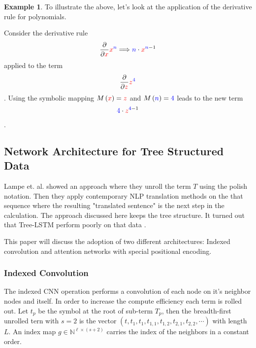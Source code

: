 \documentclass{scrartcl}
\theoremstyle{definition}
\newtheorem{exmp}{Example}[section]
\begin{document}
\begin{exmp}
To illustrate the above, let's look at the application of the derivative rule for polynomials.

Consider the derivative rule
\begin{align}
	\frac{\partial}{\partial {\color{red}x}} {\color{red}x}^{\color{blue}n} \Longrightarrow {\color{blue}n}\cdot {\color{red}x}^{{\color{blue}n}-1} 
\end{align}
applied to the term
\begin{align}
	\frac{\partial}{\partial {\color{red}z}} {\color{red}z}^{\color{blue}4}
\end{align}.
Using the symbolic mapping $M\left({\color{red}x}\right) = \color{red}z$ and $M\left({\color{blue}n} \right) = {\color{blue}4}$ leads to the new term
\begin{align}
	{\color{blue}4}\cdot {\color{red}z}^{{\color{blue}4}-1} 
\end{align}.

\end{exmp}

\subsection{Network Architecture for Tree Structured Data}

Lampe et. al. showed an approach where they unroll the term $T$ using the polish notation.
Then they apply contemporary NLP translation methods on the that sequence where the resulting "translated sentence" is the next step in the calculation. \cite{Lample2020Deep}
The approach discussed here keeps the tree structure. It turned out that Tree-LSTM perform poorly on that data \cite{tai2015improved}.


This paper will discuss the adoption of two different architectures:
Indexed convolution and attention networks with special positional encoding.

\subsubsection{Indexed Convolution}

The indexed CNN operation performs a convolution of each node on it's neighbor nodes and itself.
In order to increase the compute efficiency each term is rolled out.
Let $t_p$ be the symbol at the root of sub-term $T_p$,
then the breadth-first unrolled tern with $s=2$ is the vector $\left( t, t_1, t_1, t_{1,1},t_{1,2}, t_{2,1}, t_{2,2}, \cdots \right)$ with length $L$.
An index map $g \in \mathbb{N}^{\ell\times \left( s+2 \right)}$ carries the index of the neighbors in a constant order.
\end{document}
